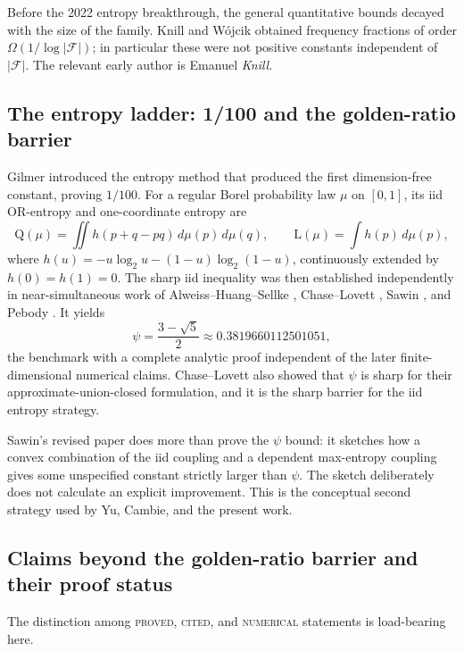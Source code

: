 \documentclass[11pt]{article}
\theoremstyle{plain}
\theoremstyle{definition}
\theoremstyle{remark}
\newcommand{\Lb}{\mathrm{L}}
\newcommand{\Qq}{\mathrm{Q}}
\newcommand{\PROVED}{\textsc{proved}}
\newcommand{\CITED}{\textsc{cited}}
\newcommand{\NUMERICAL}{\textsc{numerical}}
\begin{document}
Before the 2022 entropy breakthrough, the general quantitative bounds decayed
with the size of the family.  Knill \cite{knill} and W\'ojcik \cite{wojcik}
obtained frequency fractions of order $\Omega(1/\log|\mathcal F|)$; in
particular these were not positive constants independent of
$|\mathcal F|$.  The relevant early author is Emanuel \emph{Knill}.

\subsection{The entropy ladder: 1/100 and the golden-ratio barrier}
Gilmer \cite{gilmer} introduced the entropy method that produced the first
dimension-free constant, proving $1/100$.  For a regular Borel probability law
$\mu$ on $[0,1]$, its iid OR-entropy and one-coordinate entropy are
\[
\Qq(\mu)=\iint h(p+q-pq)\,d\mu(p)\,d\mu(q),
\qquad
\Lb(\mu)=\int h(p)\,d\mu(p),
\]
where $h(u)=-u\log_2u-(1-u)\log_2(1-u)$, continuously extended by
$h(0)=h(1)=0$.  The sharp iid inequality was then established independently
in near-simultaneous work of Alweiss--Huang--Sellke
\cite{ahs}, Chase--Lovett \cite{chaselovett}, Sawin \cite{sawin}, and Pebody
\cite{pebody}.  It yields
\[
\psi=\frac{3-\sqrt5}{2}\approx0.3819660112501051,
\]
the benchmark with a complete analytic proof independent of the later
finite-dimensional numerical claims.  Chase--Lovett also showed that $\psi$
is sharp for their
approximate-union-closed formulation, and it is the sharp barrier for the iid
entropy strategy.

Sawin's revised paper \cite[\S2]{sawin} does more than prove the $\psi$ bound:
it sketches how a convex combination of the iid coupling and a dependent
max-entropy coupling gives some unspecified constant strictly larger than
$\psi$.  The sketch deliberately does not calculate an explicit improvement.
This is the conceptual second strategy used by Yu, Cambie, and the present
work.

\subsection{Claims beyond the golden-ratio barrier and their proof status}
The distinction among \PROVED{}, \CITED{}, and \NUMERICAL{} statements is
load-bearing here.
\end{document}
